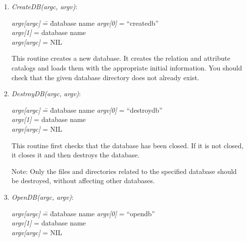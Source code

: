 \begin{enumerate}
\item\emph{CreateDB(argc, argv)}:
\begin{tabbing}
\hspace*{0.2in}\emph{argv[argc]} \= = \= database name \kill
\hspace*{0.2in}\emph{argv[0]}    \> = \> ``createdb''  \\
\hspace*{0.2in}\emph{argv[1]}    \> = \> database name \\
\hspace*{0.2in}\emph{argv[argc]} \> = \> NIL
\end{tabbing}

This routine creates a new database.  It creates the relation and
attribute catalogs and loads them with the appropriate initial
information. You should check that the given database directory does
not already exist.

\item\emph{DestroyDB(argc, argv)}:
\begin{tabbing}
\hspace*{0.2in}\emph{argv[argc]} \= = \= database name   \kill
\hspace*{0.2in}\emph{argv[0]}    \> = \> ``destroydb''   \\
\hspace*{0.2in}\emph{argv[1]}    \> = \> database name   \\
\hspace*{0.2in}\emph{argv[argc]} \> = \> NIL
\end{tabbing}

This routine first checks that the database has been closed.
If it is not closed, it closes it and then destroys the database.

Note: Only the files and directories related to the specified database
should be destroyed, without affecting other databases.

\item\emph{OpenDB(argc, argv)}:
\begin{tabbing}
\hspace*{0.2in}\emph{argv[argc]} \= = \= database name \kill
\hspace*{0.2in}\emph{argv[0]}    \> = \> ``opendb''    \\
\hspace*{0.2in}\emph{argv[1]}    \> = \> database name \\
\hspace*{0.2in}\emph{argv[argc]} \> = \> NIL
\end{tabbing}


\end{enumerate}
